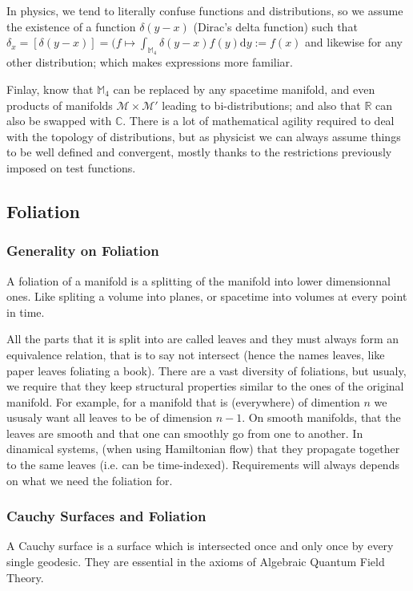 \documentclass[a4paper,11pt]{article}
\numberwithin{equation}{section}
\theoremstyle{definition}
\renewcommand{\d}{{\mathrm{d}}}
\begin{document}
    In physics, we tend to literally confuse functions and distributions, so we assume the existence of a function $\delta(y-x)$ (Dirac's delta function) such that $\delta_x=[\delta(y-x)]=(f\mapsto \int_{\mathbb{M}_4}\delta(y-x)f(y)\d y:=f(x)$ and likewise for any other distribution; which makes expressions more familiar.

    Finlay, know that $\mathbb{M}_4$ can be replaced by any spacetime manifold, and even products of manifolds $\mathcal{M}\times\mathcal{M}'$ leading to bi-distributions; and also that $\mathbb{R}$ can also be swapped with $\mathbb{C}$. There is a lot of mathematical agility required to deal with the topology of distributions, but as physicist we can always assume things to be well defined and convergent, mostly thanks to the restrictions previously imposed on test functions.

\subsection{Foliation}
    \subsubsection{Generality on Foliation}
    A foliation of a manifold is a splitting of the manifold into lower dimensionnal ones. Like spliting a volume into planes, or spacetime into volumes at every point in time.

    All the parts that it is split into are called leaves and they must always form an equivalence relation, that is to say not intersect (hence the names leaves, like paper leaves foliating a book). There are a vast diversity of foliations, but usualy, we require that they keep structural properties similar to the ones of the original manifold. For example, for a manifold that is (everywhere) of dimention $n$ we ususaly want all leaves to be of dimension $n-1$. On smooth manifolds, that the leaves are smooth and that one can smoothly go from one to another. In dinamical systems, (when using Hamiltonian flow) that they propagate together to the same leaves (i.e. can be time-indexed). Requirements will always depends on what we need the foliation for.

\subsubsection{Cauchy Surfaces and Foliation}
    A Cauchy surface is a surface which is intersected once and only once by every single geodesic. They are essential in the axioms of Algebraic Quantum Field Theory.
\end{document}

